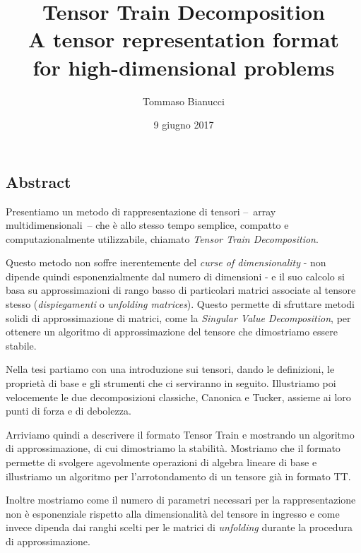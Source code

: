 \documentclass[11pt,a4paper]{article}
\title{Tensor Train Decomposition\\A tensor representation format\\for high-dimensional problems}
\author{Tommaso Bianucci}
\date{9 giugno 2017}
\begin{document}
\maketitle
\begin{center}
\subsection*{Abstract}
\end{center}

Presentiamo un metodo di rappresentazione di tensori --~array multidimensionali~-- che è allo stesso tempo semplice, compatto e computazionalmente utilizzabile, chiamato \emph{Tensor Train Decomposition}.

Questo metodo non soffre inerentemente del \emph{curse of dimensionality} - non dipende quindi esponenzialmente dal numero di dimensioni - e il suo calcolo si basa su approssimazioni di rango basso di particolari matrici associate al tensore stesso (\emph{dispiegamenti} o \emph{unfolding matrices}).
Questo permette di sfruttare metodi solidi di approssimazione di matrici, come la \emph{Singular Value Decomposition}, per ottenere un algoritmo di approssimazione del tensore che dimostriamo essere stabile.

Nella tesi partiamo con una introduzione sui tensori, dando le definizioni, le proprietà di base e gli strumenti che ci serviranno in seguito.
Illustriamo poi velocemente le due decomposizioni classiche, Canonica e Tucker, assieme ai loro punti di forza e di debolezza.

Arriviamo quindi a descrivere il formato Tensor Train e mostrando un algoritmo di approssimazione, di cui dimostriamo la stabilità. Mostriamo che il formato permette di svolgere agevolmente operazioni di algebra lineare di base e illustriamo un algoritmo per l'arrotondamento di un tensore già in formato TT.

Inoltre mostriamo come il numero di parametri necessari per la rappresentazione non è esponenziale rispetto alla dimensionalità del tensore in ingresso e come invece dipenda dai ranghi scelti per le matrici di \emph{unfolding} durante la procedura di approssimazione.
\end{document}
